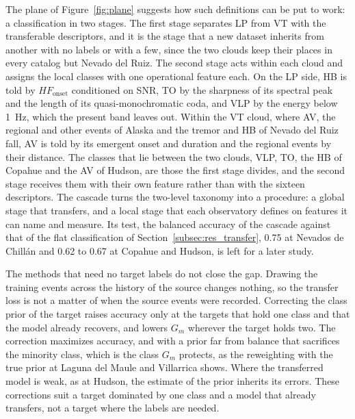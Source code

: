 \documentclass[pdflatex,sn-mathphys-num]{sn-jnl}
\begin{document}
The plane of Figure~\ref{fig:plane} suggests how such definitions can be
put to work: a classification in two stages. The first stage separates LP
from VT with the transferable descriptors, and it is the stage that a new
dataset inherits from another with no labels or with a few, since the two clouds keep their places in every catalog
but Nevado del Ruiz. The second stage acts within
each cloud and assigns the local classes with one operational feature each.
On the LP side, HB is told by $HF_{\text{onset}}$ conditioned on SNR,
TO by the sharpness of its spectral peak and the length of its
quasi-monochromatic coda, and VLP by the energy below 1~Hz, which the
present band leaves out. Within the VT cloud, where AV, the regional and
other events of Alaska and the tremor and HB of Nevado del Ruiz fall, AV is
told by its emergent onset and duration and the regional events by their
distance. The classes that lie between the two clouds, VLP, TO, the HB of
Copahue and the AV of Hudson, are those the first stage divides, and the
second stage receives them with their own feature rather than with the
sixteen descriptors. The cascade turns the two-level taxonomy into a
procedure: a global stage that transfers, and a local stage that each
observatory defines on features it can name and measure. Its test, the
balanced accuracy of the cascade against that of the flat classification
of Section~\ref{subsec:res_transfer}, 0.75 at Nevados de Chill\'an and
0.62 to 0.67 at Copahue and Hudson, is left for a later study.

The methods that need no target labels do not close the gap. Drawing the
training events across the history of the source changes nothing, so the
transfer loss is not a matter of when the source events were recorded.
Correcting the class prior of the target raises accuracy only at the
targets that hold one class and that the model already recovers, and lowers
$G_m$ wherever the target holds two. The
correction maximizes accuracy, and with a prior far from balance that
sacrifices the minority class, which is the class $G_m$ protects, as the
reweighting with the true prior at Laguna del Maule and Villarrica shows.
Where the transferred model is weak, as at Hudson, the estimate of
the prior inherits its errors. These corrections suit a target dominated by
one class and a model that already transfers, not a target where the labels
are needed.
\end{document}
